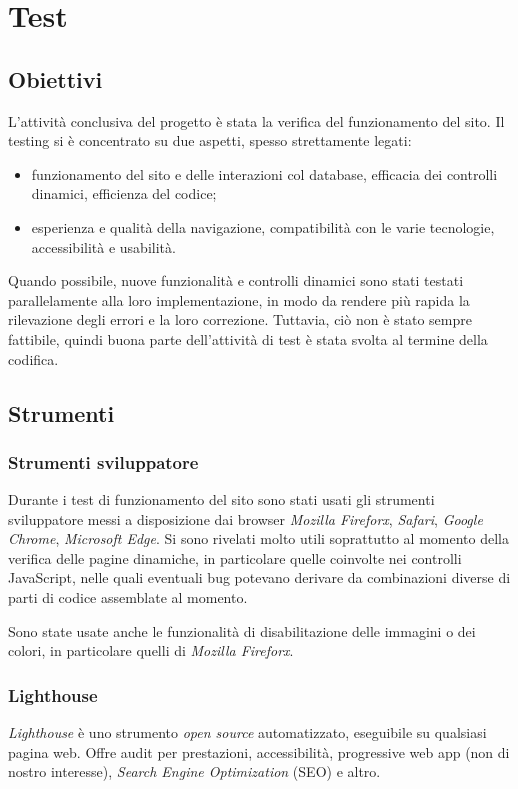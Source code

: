 \section{Test}
\label{test}

\subsection{Obiettivi}
\label{test-obiettivi}

L'attività conclusiva del progetto è stata la verifica del funzionamento del sito. Il testing si è concentrato su due aspetti, spesso strettamente legati: 
\begin{itemize}
	\item funzionamento del sito e delle interazioni col database, efficacia dei controlli dinamici, efficienza del codice;
	\item esperienza e qualità della navigazione, compatibilità con le varie tecnologie, accessibilità e usabilità.
\end{itemize}
Quando possibile, nuove funzionalità e controlli dinamici sono stati testati parallelamente alla loro implementazione, in modo da rendere più rapida la rilevazione degli errori e la loro correzione. Tuttavia, ciò non è stato sempre fattibile, quindi buona parte dell'attività di test è stata svolta al termine della codifica.

\subsection{Strumenti}
\label{test-strumenti}

\subsubsection{Strumenti sviluppatore}
\label{test-strumenti-sviluppatore}
Durante i test di funzionamento del sito sono stati usati gli strumenti sviluppatore messi a disposizione dai browser \textit{Mozilla Fireforx}, \textit{Safari}, \textit{Google Chrome}, \textit{Microsoft Edge}. Si sono rivelati molto utili soprattutto al momento della verifica delle pagine dinamiche, in particolare quelle coinvolte nei controlli JavaScript, nelle quali eventuali bug potevano derivare da combinazioni diverse di parti di codice assemblate al momento.

Sono state usate anche le funzionalità di disabilitazione delle immagini o dei colori, in particolare quelli di \textit{Mozilla Fireforx}.


\subsubsection{Lighthouse}
\label{test-strumenti-lighthouse}
\textit{Lighthouse} è uno strumento \textit{open source} automatizzato, eseguibile su qualsiasi pagina web. Offre audit per prestazioni, accessibilità, progressive web app (non di nostro interesse), \textit{Search Engine Optimization} (SEO) e altro.

